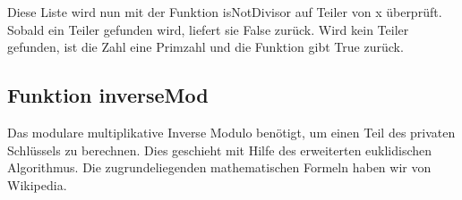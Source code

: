 \documentclass[a4paper, 11pt]{article} %
\begin{document}
Diese Liste wird nun mit der Funktion isNotDivisor auf Teiler von x überprüft. Sobald ein Teiler gefunden wird, liefert sie False zurück. Wird kein Teiler gefunden, ist die Zahl eine Primzahl und die Funktion gibt True zurück.


\subsection{Funktion inverseMod}
Das modulare multiplikative Inverse Modulo benötigt, um einen Teil des privaten Schlüssels zu berechnen. Dies geschieht mit Hilfe des erweiterten euklidischen Algorithmus. Die zugrundeliegenden mathematischen Formeln haben wir von Wikipedia.



\end{document}
